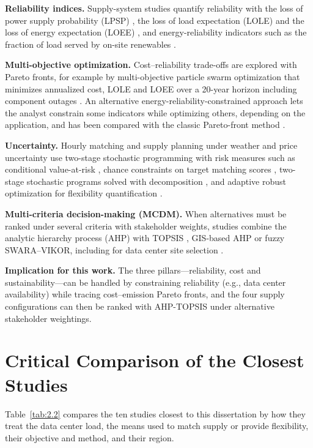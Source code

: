 \textbf{Reliability indices.} Supply-system studies quantify reliability with the loss of power supply probability (LPSP) \cite{r31}, the loss of load expectation (LOLE) and the loss of energy expectation (LOEE) \cite{r32}, and energy-reliability indicators such as the fraction of load served by on-site renewables \cite{r39}.

\textbf{Multi-objective optimization.} Cost--reliability trade-offs are explored with Pareto fronts, for example by multi-objective particle swarm optimization that minimizes annualized cost, LOLE and LOEE over a 20-year horizon including component outages \cite{r32}. An alternative energy-reliability-constrained approach lets the analyst constrain some indicators while optimizing others, depending on the application, and has been compared with the classic Pareto-front method \cite{r39}.

\textbf{Uncertainty.} Hourly matching and supply planning under weather and price uncertainty use two-stage stochastic programming with risk measures such as conditional value-at-risk \cite{r14}, chance constraints on target matching scores \cite{r16}, two-stage stochastic programs solved with decomposition \cite{r5,r22}, and adaptive robust optimization for flexibility quantification \cite{r19}.

\textbf{Multi-criteria decision-making (MCDM).} When alternatives must be ranked under several criteria with stakeholder weights, studies combine the analytic hierarchy process (AHP) with TOPSIS \cite{r36}, GIS-based AHP \cite{r37} or fuzzy SWARA--VIKOR, including for data center site selection \cite{r34}.

\textbf{Implication for this work.} The three pillars---reliability, cost and sustainability---can be handled by constraining reliability (e.g., data center availability) while tracing cost--emission Pareto fronts, and the four supply configurations can then be ranked with AHP-TOPSIS under alternative stakeholder weightings.

\section{Critical Comparison of the Closest Studies}\label{sec:2-12}

Table~\ref{tab:2.2} compares the ten studies closest to this dissertation by how they treat the data center load, the means used to match supply or provide flexibility, their objective and method, and their region.

